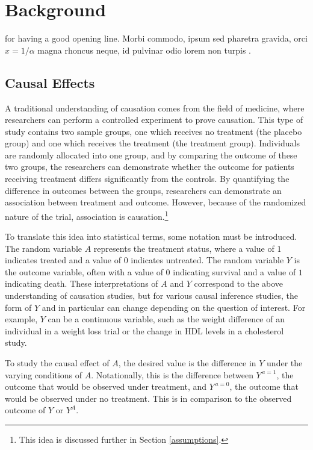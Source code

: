 
\chapter{Background}

 for having a good opening line. Morbi commodo, ipsum sed pharetra gravida, orci  $x = 1/\alpha$ magna rhoncus neque, id pulvinar odio lorem non turpis \cite{Eigen1971, Knuth1968}. 


\section{Causal Effects} 

A traditional understanding of causation comes from the field of medicine, where researchers can perform a controlled experiment to prove causation.  This type of study contains two sample groups, one which receives no treatment (the placebo group) and one which receives the treatment (the treatment group).  Individuals are randomly allocated into one group, and by comparing the outcome of these two groups, the researchers can demonstrate whether the outcome for patients receiving treatment differs significantly from the controls.  By quantifying the difference in outcomes between the groups, researchers can demonstrate an association between treatment and outcome.  However, because of the randomized nature of the trial, association is causation.\footnote{This idea is discussed further in Section \ref{assumptions}.}\cite{hernan2006estimating}  

To translate this idea into statistical terms, some notation must be introduced.  The random variable $A$ represents the treatment status, where a value of $1$ indicates treated and a value of $0$ indicates untreated.  The random variable $Y$ is the outcome variable, often with a value of $0$ indicating survival and a value of $1$ indicating death.  These interpretations of $A$ and $Y$ correspond to the above understanding of causation studies, but for various causal inference studies, the form of $Y$ and  in particular can change depending on the question of interest.  For example, $Y$ can be a continuous variable, such as the weight difference of an individual in a weight loss trial or the change in HDL levels in a cholesterol study. 

To study the causal effect of $A$, the desired value is the difference in $Y$ under the varying conditions of $A$.  Notationally, this is the difference between $Y^{\, a=1}$,  the outcome that would be observed under treatment, and $Y^{\, a=0}$, the outcome that would be observed under no treatment.  This is in comparison to the observed outcome of $Y$ or $Y^A$.  

